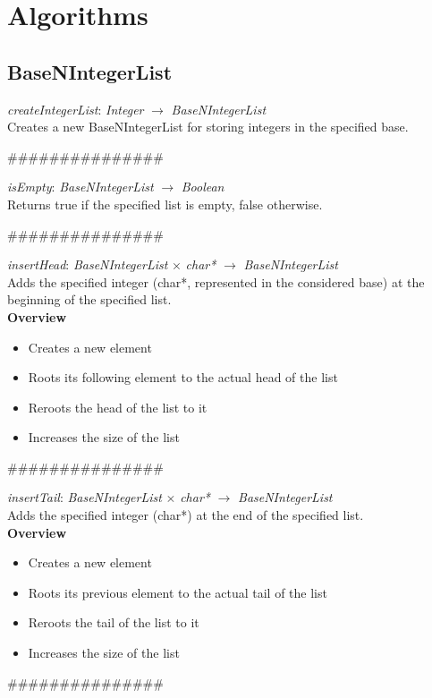 \documentclass[book, backcover, english, nodocumentinfo]{upmethodology-document}
\newcommand{\nxtalgo}{\centerline{$$$$\#\#\#\#\#\#\#\#\#\#\#\#\#\#\#$$$$}}
\newcommand{\ov}{\textbf{Overview}}
\begin{document}
\chapter{Algorithms}
	\section{BaseNIntegerList}

		\begin{minipage}{\linewidth}
			\textit{createIntegerList}: \textit{Integer} $\rightarrow$ \textit{BaseNIntegerList}\\
			Creates a new BaseNIntegerList for storing integers in the specified base.
			\label{algo:BNIL-CreateIntegerList}
			
		\end{minipage}
		\nxtalgo{}

		\begin{minipage}{\linewidth}
			\textit{isEmpty}: \textit{BaseNIntegerList} $\rightarrow$ \textit{Boolean}\\
			Returns true if the specified list is empty, false otherwise.
			\label{algo:BNIL-IsEmpty}
			
		\end{minipage}
		\nxtalgo{}

		\begin{minipage}{\linewidth}
			\textit{insertHead}: \textit{BaseNIntegerList} $\times$ \textit{char*} $\rightarrow$ \textit{BaseNIntegerList}\\
			Adds the specified integer (char*, represented in the considered base) at the beginning of the specified list.\\
			\ov
			\begin{itemize}
				\item Creates a new element
				\item Roots its following element to the actual head of the list
				\item Reroots the head of the list to it
				\item Increases the size of the list
			\end{itemize}
			\label{algo:BNIL-InsertHead}
			
		\end{minipage}
		\nxtalgo{}

		\begin{minipage}{\linewidth}
			\textit{insertTail}: \textit{BaseNIntegerList} $\times$ \textit{char*} $\rightarrow$ \textit{BaseNIntegerList}\\
			Adds the specified integer (char*) at the end of the specified list.\\
			\ov
			\begin{itemize}
				\item Creates a new element
				\item Roots its previous element to the actual tail of the list
				\item Reroots the tail of the list to it
				\item Increases the size of the list
			\end{itemize}
			\label{algo:BNIL-InsertTail}
			
		\end{minipage}
		\nxtalgo{}
\end{document}
